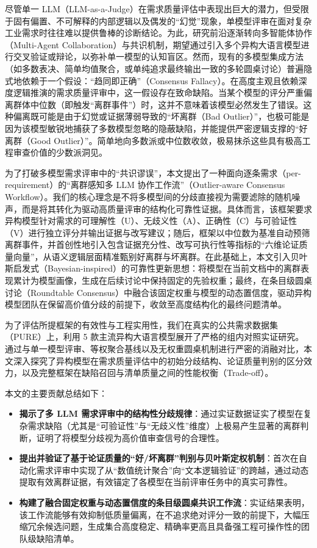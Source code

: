 \documentclass[a4paper,11pt]{ctexart}
\begin{document}
尽管单一 LLM（LLM-as-a-Judge）在需求质量评估中表现出巨大的潜力，但受限于固有偏置、不可解释的内部逻辑以及偶发的“幻觉”现象，单模型评审在面对复杂工业需求时往往难以提供鲁棒的诊断结论。为此，研究前沿逐渐转向多智能体协作（Multi-Agent Collaboration）与共识机制，期望通过引入多个异构大语言模型进行交叉验证或辩论，以弥补单一模型的认知盲区。然而，现有的多模型集成方法（如多数表决、简单均值聚合，或单纯追求最终输出一致的多轮圆桌讨论）普遍隐式地依赖于一个假设：“趋同即正确”（Consensus Fallacy）。在高度主观且依赖深度逻辑推演的需求质量评审中，这一假设存在致命缺陷。当某个模型的评分严重偏离群体中位数（即触发“离群事件”）时，这并不意味着该模型必然发生了错误。这种偏离既可能是由于幻觉或证据薄弱导致的“坏离群（Bad Outlier）”，也极可能是因为该模型敏锐地捕获了多数模型忽略的隐蔽缺陷，并能提供严密逻辑支撑的“好离群（Good Outlier）”。简单地向多数派或中位数收敛，极易抹杀这些具有极高工程审查价值的少数派洞见。

为了打破多模型需求评审中的“共识谬误”，本文提出了一种面向逐条需求（per-requirement）的“离群感知多 LLM 协作工作流”（Outlier-aware Consensus Workflow）。我们的核心理念是不将多模型间的分歧直接视为需要滤除的随机噪声，而是将其转化为驱动高质量评审的结构化可靠性证据。具体而言，该框架要求异构模型针对需求的可理解性（U）、无歧义性（A）、正确性（C）与可验证性（V）进行独立评分并输出证据与改写建议；随后，框架以中位数为基准自动预筛离群事件，并首创性地引入包含证据充分性、改写可执行性等指标的“六维论证质量向量”，从语义逻辑层面精准甄别好离群与坏离群。在此基础上，本文引入贝叶斯启发式（Bayesian-inspired）的可靠性更新思想：将模型在当前文档中的离群表现累计为模型画像，生成在后续讨论中保持固定的先验权重；最终，在条目级圆桌讨论（Roundtable Consensus）中融合该固定权重与模型的动态置信度，驱动异构模型团队在保留高价值分歧的前提下，收敛至高度结构化的最终问题清单。

为了评估所提框架的有效性与工程实用性，我们在真实的公共需求数据集（PURE）上，利用 5 款主流异构大语言模型展开了严格的组内对照实证研究。通过与单一模型评审、等权聚合基线以及无权重圆桌机制进行严密的消融对比，本文深入探究了异构模型在需求质量评估中的初始分歧结构、论证质量判别的区分效力，以及完整框架在缺陷召回与清单质量之间的性能权衡（Trade-off）。

本文的主要贡献总结如下：
\begin{itemize}
\item \textbf{揭示了多 LLM 需求评审中的结构性分歧规律}：通过实证数据证实了模型在复杂需求缺陷（尤其是“可验证性”与“无歧义性”维度）上极易产生显著的离群判断，证明了将模型分歧视为高价值审查信号的合理性。
\item \textbf{提出并验证了基于论证质量的“好/坏离群”判别与贝叶斯定权机制}：首次在自动化需求评审中实现了从“数值统计聚合”向“文本逻辑验证”的跨越，通过动态提取有效离群证据，有效锚定了各模型在当前评审任务中的真实可靠性。
\item \textbf{构建了融合固定权重与动态置信度的条目级圆桌共识工作流}：实证结果表明，该工作流能够有效抑制低质量偏离，在不追求绝对评分一致的前提下，大幅压缩冗余候选问题，生成集合高度稳定、精确率更高且具备强工程可操作性的团队级缺陷清单。
\end{itemize}
\end{document}
